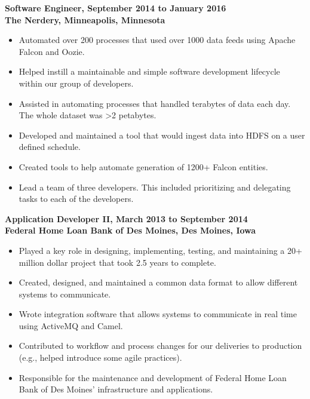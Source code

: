 \documentclass[margin]{res}
\begin{document}
\begin{resume}
{\bf  Software Engineer, September 2014 to January 2016\\
 The Nerdery, Minneapolis, Minnesota}
 \begin{itemize} \itemsep -2pt
 \item Automated over 200 processes that used over 1000 data feeds using Apache Falcon and Oozie.
 \item Helped instill a maintainable and simple software development lifecycle within our group of developers.
 \item Assisted in automating processes that handled terabytes of data each day. The whole dataset was \textgreater 2 petabytes.
 \item Developed and maintained a tool that would ingest data into HDFS on a user defined schedule. 
 \item Created tools to help automate generation of 1200+ Falcon entities.
 \item Lead a team of three developers. This included prioritizing and delegating tasks to each of the developers.
 \end{itemize}

 {\bf  Application Developer II, March 2013 to September 2014\\
 Federal Home Loan Bank of Des Moines, Des Moines, Iowa}
 \begin{itemize} \itemsep -2pt
 \item Played a key role in designing, implementing, testing, and maintaining a 20+ million dollar project that took 2.5 years to complete.
 \item Created, designed, and maintained a common data format to allow different systems to communicate.
 \item Wrote integration software that allows systems to communicate in real time using ActiveMQ and Camel.
 \item Contributed to workflow and process changes for our deliveries to production (e.g., helped introduce some agile practices).
 \item Responsible for the maintenance and development of Federal Home Loan Bank of Des Moines' infrastructure and applications.
 \end{itemize}


\end{resume}
\end{document}
